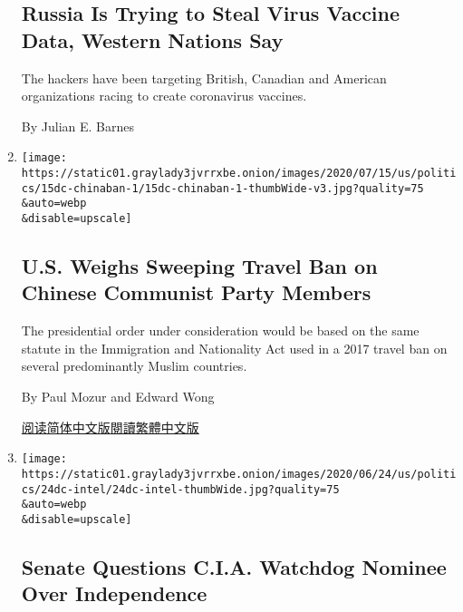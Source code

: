 \begin{enumerate}
{  \subsection{Russia Is Trying to Steal Virus Vaccine Data, Western
  Nations
  Say}\label{russia-is-trying-to-steal-virus-vaccine-data-western-nations-say}}

  The hackers have been targeting British, Canadian and American
  organizations racing to create coronavirus vaccines.

  By Julian E. Barnes
\item
  \href{/2020/07/15/us/politics/china-travel-ban.html}{}

  \texttt{[image: https://static01.graylady3jvrrxbe.onion/images/2020/07/15/us/politics/15dc-chinaban-1/15dc-chinaban-1-thumbWide-v3.jpg?quality=75\\\&auto=webp\\\&disable=upscale]}

  \hypertarget{us-weighs-sweeping-travel-ban-on-chinese-communist-party-members}{%
  \subsection{U.S. Weighs Sweeping Travel Ban on Chinese Communist Party
  Members}\label{us-weighs-sweeping-travel-ban-on-chinese-communist-party-members}}

  The presidential order under consideration would be based on the same
  statute in the Immigration and Nationality Act used in a 2017 travel
  ban on several predominantly Muslim countries.

  By Paul Mozur and Edward Wong

  \href{https://cn.nytimes3xbfgragh.onion/usa/20200716/china-travel-ban/}{阅读简体中文版}\href{https://cn.nytimes3xbfgragh.onion/usa/20200716/china-travel-ban/zh-hant/}{閱讀繁體中文版}
\item
  \href{/2020/06/24/us/politics/cia-watchdog-peter-thomson.html}{}

  \texttt{[image: https://static01.graylady3jvrrxbe.onion/images/2020/06/24/us/politics/24dc-intel/24dc-intel-thumbWide.jpg?quality=75\\\&auto=webp\\\&disable=upscale]}

  \hypertarget{senate-questions-cia-watchdog-nominee-over-independence}{%
  \subsection{Senate Questions C.I.A. Watchdog Nominee Over
  Independence}\label{senate-questions-cia-watchdog-nominee-over-independence}}


\end{enumerate}

